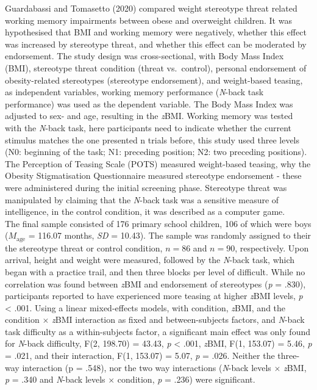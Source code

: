 \documentclass[
  stu,floatsintext]{apa7}
\begin{document}
Guardabassi and Tomasetto (2020) compared weight stereotype threat related working memory impairments between obese and overweight children.
It was hypothesised that BMI and working memory were negatively, whether this effect was increased by stereotype threat, and whether this effect can be moderated by endorsement.
The study design was cross-sectional, with Body Mass Index (BMI), stereotype threat condition (threat vs.~control), personal endorsement of obesity-related stereotypes (stereotype endorsement), and weight-based teasing, as independent variables, working memory performance (\emph{N}-back task performance) was used as the dependent variable.
The Body Mass Index was adjusted to sex- and age, resulting in the \emph{z}BMI.
Working memory was tested with the \emph{N}-back task, here participants need to indicate whether the current stimulus matches the one presented n trials before, this study used three levels (N0: beginning of the task; N1: preceding position; N2: two preceding positions).
The Perception of Teasing Scale (POTS) measured weight-based teasing, why the Obesity Stigmatisation Questionnaire measured stereotype endorsement - these were administered during the initial screening phase.
Stereotype threat was manipulated by claiming that the \emph{N}-back task was a sensitive measure of intelligence, in the control condition, it was described as a computer game.\\
The final sample consisted of 176 primary school children, 106 of which were boys (\(M_{\text{age}}\) = 116.07 months, \emph{SD} = 10.43).
The sample was randomly assigned to their the stereotype threat or control condition, \(n = 86\) and \(n = 90\), respectively.
Upon arrival, height and weight were measured, followed by the \emph{N}-back task, which began with a practice trail, and then three blocks per level of difficult.
While no correlation was found between \emph{z}BMI and endorsement of stereotypes (\emph{p} = .830), participants reported to have experienced more teasing at higher \emph{z}BMI levels, \emph{p} \textless{} .001.
Using a linear mixed-effects models, with condition, \emph{z}BMI, and the condition \(\times\) \emph{z}BMI interaction as fixed and between-subjects factors, and \emph{N}-back task difficulty as a within-subjects factor, a significant main effect was only found for \emph{N}-back difficulty, F(2, 198.70) = 43.43, \emph{p} \textless{} .001, \emph{z}BMI, F(1, 153.07) = 5.46, \emph{p} = .021, and their interaction, F(1, 153.07) = 5.07, \emph{p} = .026.
Neither the three-way interaction (p = .548), nor the two way interactions (\emph{N}-back levels \(\times\) \emph{z}BMI, \emph{p} = .340 and \emph{N}-back levels \(\times\) condition, \emph{p} = .236) were significant.
\end{document}
